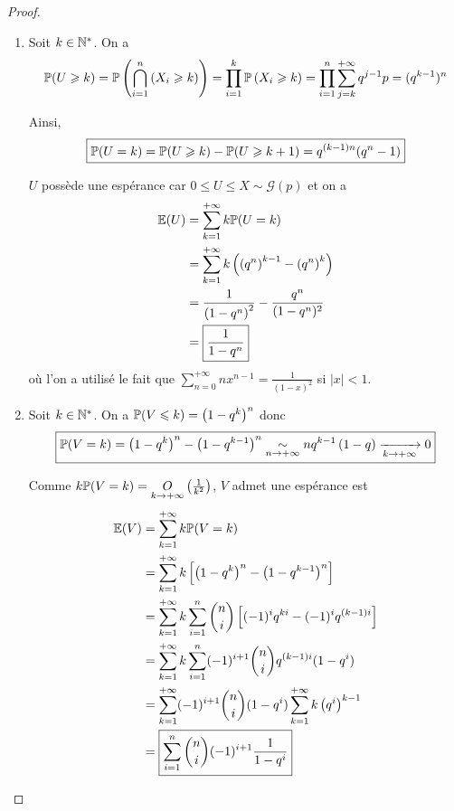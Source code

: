 \begin{proof}
    \phantom{}
    \begin{enumerate}
        \item Soit $k\in\N^{*}$. On a 
        \begin{equation}
            \P(U\geqslant k)=\P\left(\bigcap_{i=1}^{n}\left(X_{i}\geqslant k\right)\right)=\prod_{i=1}^{k}\P\left(X_{i}\geqslant k\right)=\prod_{i=1}^{n}\sum_{j=k}^{+\infty}q^{j-1}p=(q^{k-1})^{n}
        \end{equation}

        Ainsi, 
        \begin{equation}
            \boxed{\P(U=k)=\P(U\geqslant k)-\P(U\geqslant k+1)=q^{(k-1)n}(q^{n}-1)}
        \end{equation}

        $U$ possède une espérance car $0\leqslant U\leqslant X\sim\mathcal{G}(p)$ et on a 
        \begin{align}
            \E(U)
            &=\sum_{k=1}^{+\infty}k\P(U=k)\\
            &=\sum_{k=1}^{+\infty}k\left(\left(q^{n}\right)^{k-1}-\left(q^{n}\right)^{k}\right)\\
            &=\frac{1}{\left(1-q^{n}\right)^{2}}-\frac{q^{n}}{(1-q^{n})^{2}}\\
            &=\boxed{\frac{1}{1-q^{n}}}
        \end{align}
        où l'on a utilisé le fait que $\sum_{n=0}^{+\infty}nx^{n-1}=\frac{1}{(1-x)^{2}}$ si $\left\lvert x\right\rvert<1$.

        \item Soit $k\in\N^{*}$. On a $\P(V\leqslant k)=\left(1-q^{k}\right)^{n}$ donc 
        \begin{equation}
            \boxed{\P(V=k)=\left(1-q^{k}\right)^{n}-\left(1-q^{k-1}\right)^{n}\underset{n\to+\infty}{\sim}nq^{k-1}\left(1-q\right)\xrightarrow[k\to+\infty]{}0}
        \end{equation}

        Comme $k\P(V=k)=\underset{k\to+\infty}{O}\left(\frac{1}{k^{2}}\right)$, $V$ admet une espérance est 
        \begin{align}
            \E(V)
            &=\sum_{k=1}^{+\infty}k\P(V=k)\\
            &=\sum_{k=1}^{+\infty}k\left[\left(1-q^{k}\right)^{n}-\left(1-q^{k-1}\right)^{n}\right]\\
            &=\sum_{k=1}^{+\infty}k\sum_{i=1}^{n}\binom{n}{i}\left[(-1)^{i}q^{ki}-(-1)^{i}q^{(k-1)i}\right]\\
            &=\sum_{k=1}^{+\infty}k\sum_{i=1}^{n}(-1)^{i+1}\binom{n}{i}q^{(k-1)i}(1-q^{i})\\
            &=\sum_{k=1}^{+\infty}(-1)^{i+1}\binom{n}{i}(1-q^{i})\sum_{k=1}^{+\infty}k\left(q^{i}\right)^{k-1}\\
            &=\boxed{\sum_{i=1}^{n}\binom{n}{i}(-1)^{i+1}\frac{1}{1-q^{i}}}
        \end{align}
    \end{enumerate}
\end{proof}

